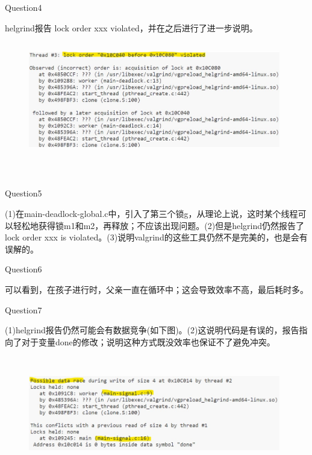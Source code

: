 \documentclass[11pt]{article}
\begin{document}
\begin{large}
	\noindent Question4\\
\end{large}
\hspace*{2em}helgrind报告 lock order xxx violated，并在之后进行了进一步说明。
\begin{figure}[h]
    \includegraphics[width=11cm,height=5cm]{p7-2.jpg}
    \centering
\end{figure}\\
\newpage
\begin{large}
	\noindent Question5\\
\end{large}
\hspace*{2em}(1)在main-deadlock-global.c中，引入了第三个锁g，从理论上说，这时某个线程可以轻松地获得锁m1和m2，再释放；不应该出现问题。(2)但是helgrind仍然报告了lock order xxx is violated。(3)说明valgrind的这些工具仍然不是完美的，也是会有误解的。\\

\begin{large}
	\noindent Question6\\
\end{large}
\hspace*{2em}可以看到，在孩子进行时，父亲一直在循环中；这会导致效率不高，最后耗时多。\\

\begin{large}
	\noindent Question7\\
\end{large}
\hspace*{2em}(1)helgrind报告仍然可能会有数据竞争(如下图)。(2)这说明代码是有误的，报告指向了对于变量done的修改；说明这种方式既没效率也保证不了避免冲突。
\begin{figure}[h]
    \includegraphics[width=11cm,height=5cm]{p7-3.jpg}
    \centering
\end{figure}\\
\end{document}
